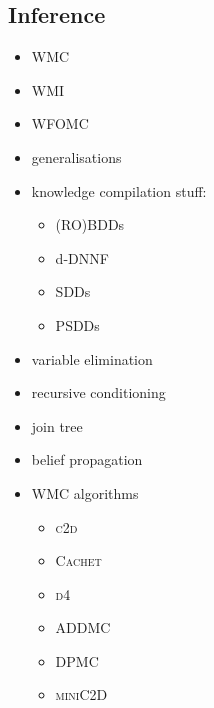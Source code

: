 \documentclass{article}
\begin{document}
\subsection{Inference}

\begin{itemize}
\item WMC \cite{DBLP:journals/ai/ChaviraD08}
\item WMI \cite{DBLP:conf/ijcai/BellePB15}
\item WFOMC \cite{DBLP:conf/ijcai/BroeckTMDR11,DBLP:journals/cacm/GogateD16}
\item generalisations
  \cite{DBLP:journals/ijar/BelleR20,DBLP:journals/jair/BacchusDP09,DBLP:journals/japll/KimmigBR17}
\item knowledge compilation stuff:
  \begin{itemize}
  \item (RO)BDDs \cite{DBLP:journals/tc/Bryant86}
  \item d-DNNF \cite{DBLP:journals/jancl/Darwiche01}
  \item SDDs \cite{DBLP:conf/ijcai/Darwiche11}
  \item PSDDs \cite{DBLP:conf/kr/KisaBCD14}
  \end{itemize}
\item variable elimination \cite{DBLP:journals/ai/Dechter99}
\item recursive conditioning \cite{DBLP:journals/ai/Darwiche01}
\item join tree \cite{lauritzen1988local}
\item belief propagation \cite{DBLP:conf/aaai/Pearl82}
\item WMC algorithms
  \begin{itemize}
  \item \textsc{c2d} \cite{DBLP:conf/ecai/Darwiche04}
  \item \textsc{Cachet} \cite{DBLP:conf/sat/SangBBKP04,DBLP:conf/sat/SangBK05,DBLP:conf/aaai/SangBK05}
  \item \textsc{d4} \cite{DBLP:conf/ijcai/LagniezM17}
  \item \textsc{ADDMC} \cite{DBLP:conf/aaai/DudekPV20}
  \item \textsc{DPMC} \cite{DBLP:conf/cp/DudekPV20}
  \item \textsc{miniC2D} \cite{DBLP:conf/ijcai/OztokD15}
  \end{itemize}
\end{itemize}
\end{document}
